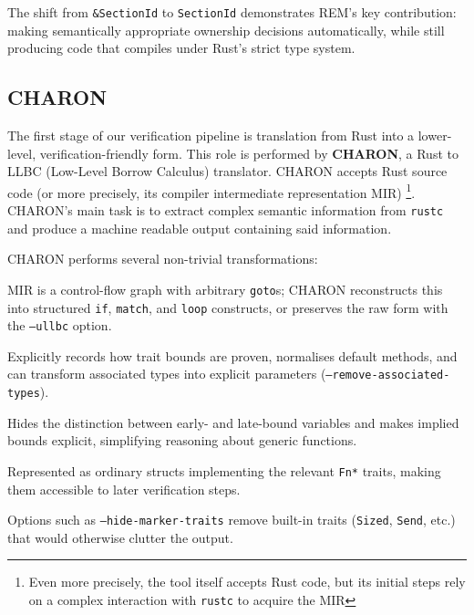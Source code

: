 The shift from \verb|&SectionId| to \verb|SectionId| demonstrates REM's key
contribution: making semantically appropriate ownership decisions automatically,
while still producing code that compiles under Rust's strict type system.

\subsection{CHARON}
\label{subsec:charon}

The first stage of our verification pipeline is translation from Rust into a
lower-level, verification-friendly form. This role is performed by
\textbf{CHARON}, a Rust to LLBC (Low-Level Borrow Calculus) translator. CHARON
accepts Rust source code (or more precisely, its compiler intermediate
representation MIR) \footnote{Even more precisely, the tool itself accepts Rust
code, but its initial steps rely on a complex interaction with \texttt{rustc} to
acquire the MIR}. CHARON's main task is to extract complex semantic information
from \verb|rustc| and produce a machine readable output containing said
information.

CHARON performs several non-trivial transformations:
\begin{description}[leftmargin=!,labelwidth=2cm]
  \item[Structured control flow.] MIR is a control-flow graph with arbitrary
  \texttt{goto}s; CHARON reconstructs this into structured \texttt{if},
  \texttt{match}, and \texttt{loop} constructs, or preserves the raw form with
  the \texttt{--ullbc} option.
  \item[Trait and type resolution.] Explicitly records how trait bounds are
  proven, normalises default methods, and can transform associated types into
  explicit parameters (\texttt{--remove-associated-types}).
  \item[Lifetime handling.] Hides the distinction between early- and late-bound
  variables and makes implied bounds explicit, simplifying reasoning about
  generic functions. \item[Closures and vtables.] Represented as ordinary
  structs implementing the relevant
  \texttt{Fn*} traits, making them accessible to later verification steps.
  \item[Noise reduction.] Options such as \texttt{--hide-marker-traits} remove
  built-in traits (\texttt{Sized}, \texttt{Send}, etc.) that would otherwise
  clutter the output.
\end{description}

